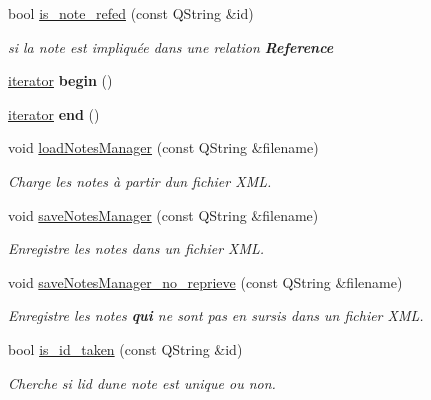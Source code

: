 \begin{DoxyCompactItemize}
bool \hyperlink{class_notes_manager_af65b38c59f820e9d39fa90c34d17d7c8}{is\+\_\+note\+\_\+refed} (const Q\+String \&id)
\begin{DoxyCompactList}\small\item\em si la note est impliquée dans une relation {\bfseries Reference} \end{DoxyCompactList}\item 
\mbox{\label{class_notes_manager_ac4a803e38805eb91980fb82e1b13aa90}} 
\hyperlink{class_notes_manager_1_1iterator}{iterator} {\bfseries begin} ()
\item 
\mbox{\label{class_notes_manager_ad8dec1c38985668e543c799a7615c049}} 
\hyperlink{class_notes_manager_1_1iterator}{iterator} {\bfseries end} ()
\item 
void \hyperlink{class_notes_manager_a93e5faec46176d813a8915be6982c337}{load\+Notes\+Manager} (const Q\+String \&filename)
\begin{DoxyCompactList}\small\item\em Charge les notes à partir d\textquotesingle{}un fichier X\+ML. \end{DoxyCompactList}\item 
void \hyperlink{class_notes_manager_a40601558ad4dbea7d91d613b2272c0f5}{save\+Notes\+Manager} (const Q\+String \&filename)
\begin{DoxyCompactList}\small\item\em Enregistre les notes dans un fichier X\+ML. \end{DoxyCompactList}\item 
void \hyperlink{class_notes_manager_abc81829bdbc04b323fdfd523664e277d}{save\+Notes\+Manager\+\_\+no\+\_\+reprieve} (const Q\+String \&filename)
\begin{DoxyCompactList}\small\item\em Enregistre les notes {\bfseries qui} ne sont pas en sursis dans un fichier X\+ML. \end{DoxyCompactList}\item 
bool \hyperlink{class_notes_manager_a86a43e5cb3d5d62fb2b0da27138f8412}{is\+\_\+id\+\_\+taken} (const Q\+String \&id)
\begin{DoxyCompactList}\small\item\em Cherche si l\textquotesingle{}id d\textquotesingle{}une note est unique ou non. \end{DoxyCompactList}\end{DoxyCompactItemize}

